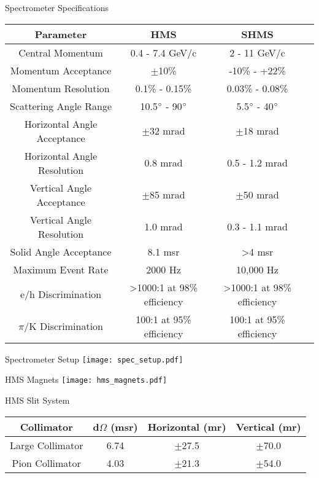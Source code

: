 \begin{Mtable}{Spectrometer Specifications}
  \centering
  \begin{tabular}{|c|c|c|c|}
    \hline
    \textbf{Parameter} & \textbf{HMS} & \textbf{SHMS}\\
    \hline
    Central Momentum & 0.4 - 7.4 GeV/c & 2 - 11 GeV/c \\
    Momentum Acceptance & $\pm$10\% & -10\% - +22\% \\
    Momentum Resolution & 0.1\% - 0.15\% & 0.03\% - 0.08\% \\
    Scattering Angle Range & 10.5$\degree$ - 90$\degree$ & 5.5$\degree$ - 40$\degree$ \\
    \hline
    Horizontal Angle Acceptance & $\pm$32 mrad & $\pm$18 mrad \\
    Horizontal Angle Resolution & 0.8 mrad & 0.5 - 1.2 mrad \\
    Vertical Angle Acceptance & $\pm$85 mrad & $\pm$50 mrad \\
    Vertical Angle Resolution & 1.0 mrad & 0.3 - 1.1 mrad \\
    Solid Angle Acceptance & 8.1 msr & >4 msr \\
    \hline
    Maximum Event Rate & 2000 Hz & 10,000 Hz \\
    e/h Discrimination & >1000:1 at 98\% efficiency & >1000:1 at 98\% efficiency \\
    $\pi$/K Discrimination & 100:1 at 95\% efficiency & 100:1 at 95\% efficiency \\
    \hline
  \end{tabular}
  \caption{Break down of the HMS and SHMS specifications and capablilities.}  
  \label{tab:2-4_spectrometer}
\end{Mtable}

\begin{Mfigure}{Spectrometer Setup}
  \centering
  \texttt{[image: spec\_setup.pdf]}
  \caption{Overview of Hall C Spectrometer setup. [\cite{sta_jeerson_2019}]}
  \label{fig:2-4_spec_setup}
\end{Mfigure}

\begin{Mfigure}{HMS Magnets}
  \centering
  \texttt{[image: hms\_magnets.pdf]}
  \caption{Overview of HMS optical setup.}
  \label{fig:2-4_hms_magnets}
\end{Mfigure}

\begin{Mtable}{HMS Slit System}
  \centering
  \begin{tabular}{|c|c|c|c|}
    \hline
    \textbf{Collimator} & \textbf{d$\Omega$ (msr)} & \textbf{Horizontal (mr)} & \textbf{Vertical (mr)} \\
    \hline
    Large Collimator & 6.74 & $\pm$27.5 & $\pm$70.0 \\
    Pion Collimator & 4.03 & $\pm$21.3 & $\pm$54.0 \\
    \hline
  \end{tabular}
  \caption{Breakdown of HMS slit system's apertures.}
  \label{tab:2-4_hms_slit}
\end{Mtable}

